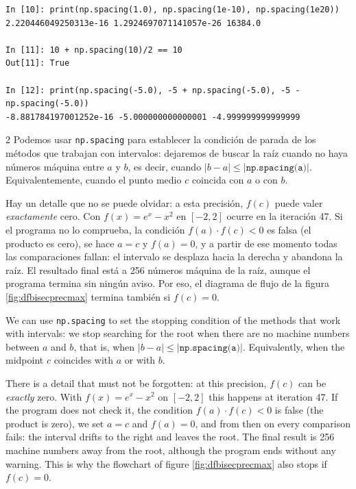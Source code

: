 \begin{verbatim}
In [10]: print(np.spacing(1.0), np.spacing(1e-10), np.spacing(1e20))
2.220446049250313e-16 1.2924697071141057e-26 16384.0

In [11]: 10 + np.spacing(10)/2 == 10
Out[11]: True

In [12]: print(np.spacing(-5.0), -5 + np.spacing(-5.0), -5 - np.spacing(-5.0))
-8.881784197001252e-16 -5.000000000000001 -4.999999999999999
\end{verbatim}
\begin{paracol}{2}
Podemos usar \texttt{np.spacing} para establecer la condición de parada de los métodos que trabajan con intervalos: dejaremos de buscar la raíz cuando no haya números máquina entre $a$ y $b$, es decir, cuando $\vert b-a \vert \leq \vert \texttt{np.spacing(a)} \vert$. Equivalentemente, cuando el punto medio $c$ coincida con $a$ o con $b$.

Hay un detalle que no se puede olvidar: a esta precisión, $f(c)$ puede valer \emph{exactamente} cero. Con $f(x)=e^x-x^2$ en $[-2,2]$ ocurre en la iteración 47. Si el programa no lo comprueba, la condición $f(a)\cdot f(c)<0$ es falsa (el producto es cero), se hace $a=c$ y $f(a)=0$, y a partir de ese momento todas las comparaciones fallan: el intervalo se desplaza hacia la derecha y abandona la raíz. El resultado final está a 256 números máquina de la raíz, aunque el programa termina sin ningún aviso. Por eso, el diagrama de flujo de la figura \ref{fig:dfbisecprecmax} termina también si $f(c)=0$.

\switchcolumn
We can use \texttt{np.spacing} to set the stopping condition of the methods that work with intervals: we stop searching for the root when there are no machine numbers between $a$ and $b$, that is, when $\vert b-a \vert \leq \vert \texttt{np.spacing(a)} \vert$. Equivalently, when the midpoint $c$ coincides with $a$ or with $b$.

There is a detail that must not be forgotten: at this precision, $f(c)$ can be \emph{exactly} zero. With $f(x)=e^x-x^2$ on $[-2,2]$ this happens at iteration 47. If the program does not check it, the condition $f(a)\cdot f(c)<0$ is false (the product is zero), we set $a=c$ and $f(a)=0$, and from then on every comparison fails: the interval drifts to the right and leaves the root. The final result is 256 machine numbers away from the root, although the program ends without any warning. This is why the flowchart of figure \ref{fig:dfbisecprecmax} also stops if $f(c)=0$.

\end{paracol}

